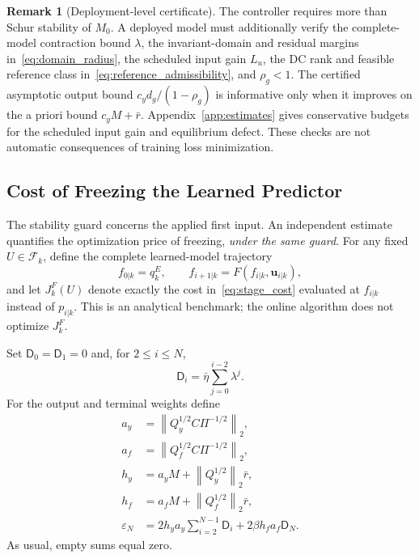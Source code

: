 \documentclass[journal]{IEEEtran}
\theoremstyle{plain}
\theoremstyle{definition}
\newtheorem{remark}{Remark}
\newcommand{\vu}{\mathbf{u}}
\newcommand{\norm}[1]{\left\lVert #1\right\rVert}
\begin{document}
\begin{remark}[Deployment-level certificate]
\label{rem:deployment}
The controller requires more than Schur stability of $M_0$. A deployed model must additionally verify the complete-model contraction bound $\lambda$, the invariant-domain and residual margins in~\eqref{eq:domain_radius}, the scheduled input gain $L_u$, the DC rank and feasible reference class in~\eqref{eq:reference_admissibility}, and $\rho_g<1$. The certified asymptotic output bound $c_y d_g/(1-\rho_g)$ is informative only when it improves on the a priori bound $c_yM+\bar r$. Appendix~\ref{app:estimates} gives conservative budgets for the scheduled input gain and equilibrium defect. These checks are not automatic consequences of training loss minimization.
\end{remark}

\subsection{Cost of Freezing the Learned Predictor}
\label{subsec:freeze_analysis}
The stability guard concerns the applied first input. An independent estimate quantifies the optimization price of freezing, \emph{under the same guard}. For any fixed $U\in\mathcal F_k$, define the complete learned-model trajectory
\begin{equation}
f_{0|k}=q_k^E,\qquad f_{i+1|k}=F(f_{i|k},\vu_{i|k}),
\label{eq:full_candidate}
\end{equation}
and let $J_k^F(U)$ denote exactly the cost in~\eqref{eq:stage_cost} evaluated at $f_{i|k}$ instead of $p_{i|k}$. This is an analytical benchmark; the online algorithm does not optimize $J_k^F$.

Set $\mathsf D_0=\mathsf D_1=0$ and, for $2\le i\le N$,
\begin{equation}
\mathsf D_i=\bar\eta\sum_{j=0}^{i-2}\lambda^j.
\label{eq:frozen_discrepancy}
\end{equation}
For the output and terminal weights define
\begin{equation}
\begin{aligned}
a_y&=\norm{Q_y^{1/2}C\Pi^{-1/2}}_2,\\
a_f&=\norm{Q_f^{1/2}C\Pi^{-1/2}}_2,\\
h_y&=a_yM+\norm{Q_y^{1/2}}_2\bar r,\\
h_f&=a_fM+\norm{Q_f^{1/2}}_2\bar r,\\
\varepsilon_N&=2h_ya_y\sum_{i=2}^{N-1}\mathsf D_i
+2\beta h_fa_f\mathsf D_N.
\end{aligned}
\label{eq:freeze_cost_budget}
\end{equation}
As usual, empty sums equal zero.
\end{document}
